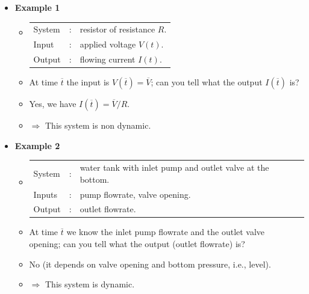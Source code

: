 \begin{frame}
\myPause
 \begin{itemize}[<+-| alert@+>]
 \item \textbf{Example 1}
       \begin{itemize}[<+-| alert@+>]
       \item[] \begin{tabular}{lll}
                System  &: & resistor of resistance $R$.\\
                Input   &: & applied voltage $V(t)$.\\
                Output  &: & flowing current $I(t)$.
               \end{tabular}
       \item \vspace{1mm}At time $\overline{t}$ the input is $V(\overline{t})=\overline{V}$; can you tell what
             the output $I(\overline{t})$ is?
       \item Yes, we have $I(\overline{t})=\overline{V}/R$.
       \item[] $\Rightarrow$ This system is non dynamic. 
       \end{itemize}
 \item \vfill\textbf{Example 2}
       \begin{itemize}[<+-| alert@+>]
       \item[] \begin{tabular}{lll}
                System  &: & water tank with inlet pump and outlet valve at the bottom.\\
                Inputs  &: & pump flowrate, valve opening.\\
                Output  &: & outlet flowrate.
               \end{tabular}
       \item \vspace{1mm}At time $\overline{t}$ we know the inlet pump flowrate and the outlet valve \\
             opening; can you tell what the output (outlet flowrate) is?
       \item No (it depends on valve opening and bottom pressure, i.e., level).
       \item[] $\Rightarrow$ This system is dynamic. 
       \end{itemize}
 \end{itemize}
\end{frame}

